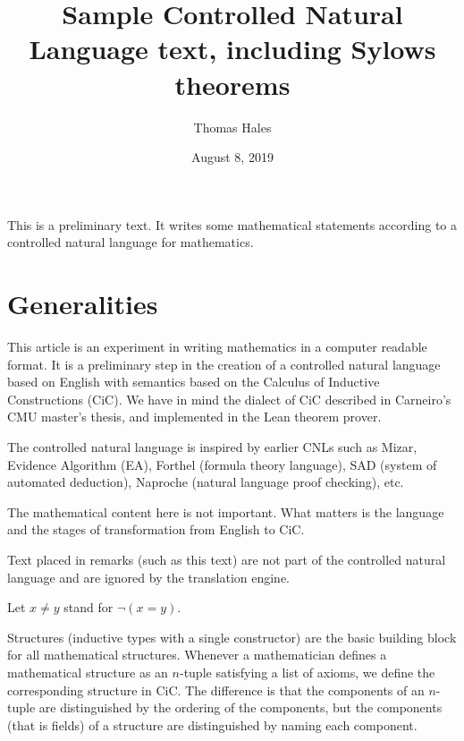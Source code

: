 \documentclass[12pt]{article}
\title{Sample Controlled Natural Language text, including Sylows theorems}
\date{August 8, 2019}
\author{Thomas Hales}
\begin{document}
\maketitle


\begin{cnl}

\begin{remark}
This is a preliminary text.  It
writes some mathematical statements according to a 
controlled natural language for mathematics.  
\end{remark}
  

\section{Generalities}
  
\begin{remark}
This article is an experiment in writing mathematics in a computer
readable format.  It is a preliminary step in the creation of a
controlled natural language based on English with semantics based on
the Calculus of Inductive Constructions (CiC).  We have in mind the
dialect of CiC described in Carneiro's CMU master's thesis, and
implemented in the Lean theorem prover.

The controlled natural language is inspired by earlier CNLs such as
Mizar, Evidence Algorithm (EA), Forthel (formula theory language), SAD
(system of automated deduction), Naproche (natural language proof
checking), etc.

The mathematical content here is not important.  What matters is the
language and the stages of transformation from English to CiC.

Text placed in remarks (such as this text) are not part of the
controlled natural language and are ignored by the translation engine.
\end{remark}
  

Let $x \ne y$ stand for $\neg(x = y)$.

\begin{remark}
Structures (inductive types with a single constructor) are the basic
building block for all mathematical structures.  Whenever a
mathematician defines a mathematical structure as an $n$-tuple
satisfying a list of axioms, we define the corresponding
structure in CiC.  The difference is that the components of an
$n$-tuple are distinguished by the ordering of the components, but the
components (that is fields) of a structure are distinguished by naming
each component.


\end{remark}
\end{cnl}
\end{document}

